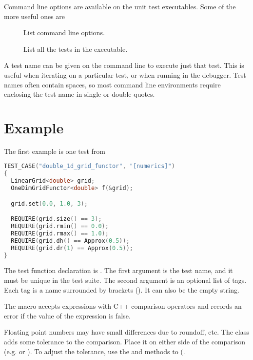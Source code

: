 Command line options are available on the unit test executables.  Some of the more useful ones are
\begin{description}
\item[]  List command line options.
\item [] List all the tests in the executable.
\end{description}

A test name can be given on the command line to execute just that test.  This is useful when iterating
on a particular test, or when running in the debugger.   Test names often contain spaces, so most command line environments require enclosing the test name in single or double quotes.



\section{Example}

The first example is one test from 

\begin{minipage}{\linewidth}
\begin{lstlisting}[language=C++,caption={Unit test example using Catch},label=CatchExample,basicstyle=\ttfamily]
TEST_CASE("double_1d_grid_functor", "[numerics]")
{
  LinearGrid<double> grid;
  OneDimGridFunctor<double> f(&grid);

  grid.set(0.0, 1.0, 3);

  REQUIRE(grid.size() == 3);
  REQUIRE(grid.rmin() == 0.0);
  REQUIRE(grid.rmax() == 1.0);
  REQUIRE(grid.dh() == Approx(0.5));
  REQUIRE(grid.dr(1) == Approx(0.5));
}
\end{lstlisting}
\end{minipage}

The test function declaration is
.
The first argument is the test name, and it must be unique in the test suite.
The second argument is an optional list of tags.  Each tag is a name surrounded by brackets ().  It can also be the empty string.

The  macro accepts expressions with C++ comparison operators and records an error if the value of the expression is false.

Floating point numbers may have small differences due to roundoff, etc.   The  class adds some tolerance to the comparison.  Place it on either side of the comparison (e.g.  or ).   To adjust the tolerance, use the  and  methods to  (.

